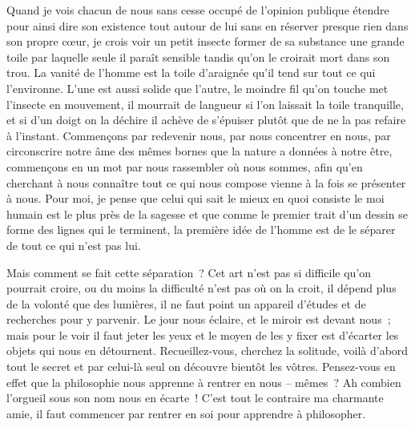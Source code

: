 
{Quand je vois chacun de nous sans cesse occupé de l'opinion publique
étendre pour ainsi dire son existence tout autour de lui sans en
réserver presque rien dans son propre cœur, je crois voir un petit
insecte former de sa substance une grande toile par laquelle seule il
paraît sensible tandis qu'on le croirait mort dans son trou. La
vanité de l'homme est la toile d'araignée qu'il tend sur tout ce qui
l'environne. L'une est aussi solide que l'autre, le moindre fil qu'on
touche met l'insecte en mouvement, il mourrait de langueur si l'on
laissait la toile tranquille, et si d'un doigt on la déchire il
achève de s'épuiser plutôt que de ne la pas refaire à l'instant.
Commençons par redevenir nous, par nous concentrer en nous, par
circonscrire notre âme des mêmes bornes que la nature a données à
notre être, commençons en un mot par nous rassembler où nous sommes,
afin qu'en cherchant à nous connaître tout ce qui nous compose vienne
à la fois se présenter à nous. Pour moi, je pense que celui qui sait
le mieux en quoi consiste le moi humain est le plus près de la
sagesse et que comme le premier trait d'un dessin se forme des lignes
qui le terminent, la première idée de l'homme est de le séparer de
tout ce qui n'est pas lui.

Mais comment se fait cette séparation~? Cet art n'est pas si difficile
qu'on pourrait croire, ou du moins la difficulté n'est pas où on la
croit, il dépend plus de la volonté que des lumières, il ne faut
point un appareil d'études et de recherches pour y parvenir. Le jour
nous éclaire, et le miroir est devant nous~; mais pour le voir il
faut jeter les yeux et le moyen de les y fixer est d'écarter les
objets qui nous en détournent. Recueillez-vous, cherchez la solitude,
voilà d'abord tout le secret et par celui-là seul on découvre bientôt
les vôtres. Pensez-vous en effet que la philosophie nous apprenne à
rentrer en nous – mêmes~? Ah combien l'orgueil sous son nom nous en
écarte~! C'est tout le contraire ma charmante amie, il faut commencer
par rentrer en soi pour apprendre à philosopher.
}


